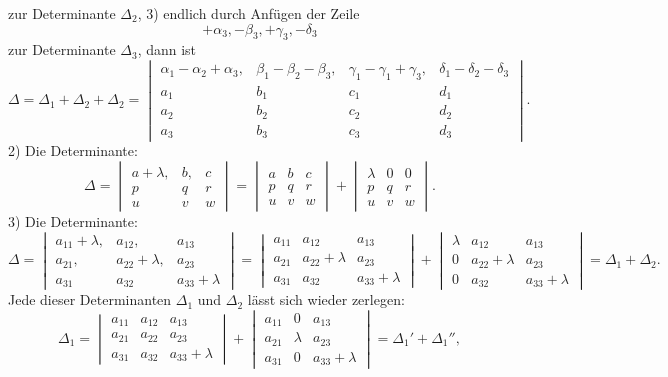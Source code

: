 zur Determinante $\varDelta_2$, 3) endlich durch Anfügen der Zeile
\[
+\alpha_3, - \beta_3, +\gamma_3, -\delta_3
\]
zur Determinante $\varDelta_3$, dann ist
\[
\varDelta = \varDelta_1+\varDelta_2+\varDelta_2 =
\begin{vmatrix}
\alpha_1-\alpha_2+\alpha_3, & \beta_1-\beta_2-\beta_3, & \gamma_1-\gamma_1+\gamma_3, & \delta_1-\delta_2-\delta_3\\
a_1 & b_1 & c_1 & d_1\\
a_2 & b_2 & c_2 & d_2\\
a_3 & b_3 & c_3 & d_3
\end{vmatrix}.
\]
2) Die Determinante:
\[
\varDelta = \begin{vmatrix} a+\lambda, & b, & c\\ p & q & r\\ u & v & w\end{vmatrix}
= \begin{vmatrix} a & b & c\\ p & q & r\\ u & v & w\end{vmatrix}
+ \begin{vmatrix} \lambda & 0 & 0\\ p & q & r\\ u & v & w\end{vmatrix}.
\]
3) Die Determinante:
\[
\varDelta = \begin{vmatrix} a_{11}+\lambda, & a_{12}, & a_{13}\\ a_{21}, & a_{22}+\lambda, & a_{23}\\ a_{31} & a_{32} & a_{33}+\lambda\end{vmatrix}
= \begin{vmatrix} a_{11} & a_{12} & a_{13}\\ a_{21} & a_{22}+\lambda & a_{23}\\ a_{31} & a_{32} & a_{33}+\lambda\end{vmatrix}
+ \begin{vmatrix} \lambda & a_{12} & a_{13}\\ 0 & a_{22}+\lambda & a_{23}\\ 0 & a_{32} & a_{33}+\lambda\end{vmatrix}
= \varDelta_1+\varDelta_2.
\]
Jede dieser Determinanten $\varDelta_1$ und $\varDelta_2$ lässt sich wieder zerlegen:
\[
\varDelta_1 = \begin{vmatrix} a_{11} & a_{12} & a_{13}\\ a_{21} & a_{22} & a_{23}\\ a_{31} & a_{32} & a_{33}+\lambda\end{vmatrix}
+ \begin{vmatrix} a_{11} & 0 & a_{13}\\ a_{21} & \lambda & a_{23}\\ a_{31} & 0 & a_{33}+\lambda\end{vmatrix}
= \varDelta_1'+\varDelta_1'',
\]
